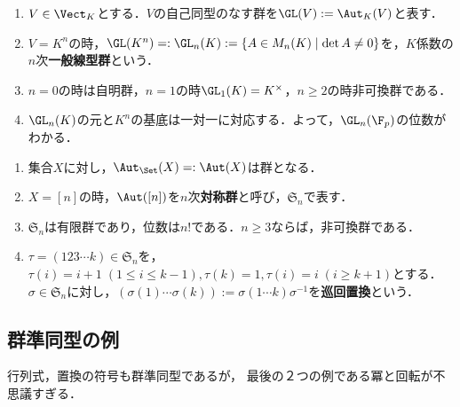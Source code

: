 \documentclass[uplatex, dvipdfmx]{jsreport}
\begin{document}
\begin{example}\mbox{}
    \begin{enumerate}
        \item $V\in\Vect_K$とする．$V$の自己同型のなす群を$\GL(V):=\Aut_K(V)$と表す．
        \item $V=K^n$の時，$\GL(K^n)=:\GL_n(K):=\{A\in M_n(K)\mid \det A\ne 0\}$を，$K$係数の$n$次\textbf{一般線型群}という．
        \item $n=0$の時は自明群，$n=1$の時$\GL_1(K)=K^\times$，$n\ge 2$の時非可換群である．
        \item $\GL_n(K)$の元と$K^n$の基底は一対一に対応する．よって，$\GL_n(\F_p)$の位数がわかる．
    \end{enumerate}
\end{example}

\begin{example}\mbox{}
    \begin{enumerate}
        \item 集合$X$に対し，$\Aut_\Set(X)=:\Aut(X)$は群となる．
        \item $X=[n]$の時，$\Aut([n])$を$n$次\textbf{対称群}と呼び，$\mathfrak{S}_n$で表す．
        \item $\mathfrak{S}_n$は有限群であり，位数は$n!$である．$n\ge 3$ならば，非可換群である．
        \item $\tau=(123\cdots k)\in\mathfrak{S}_n$を，$\tau(i)=i+1\;(1\le i\le k-1),\tau(k)=1,\tau(i)=i\;(i\ge k+1)$とする．$\sigma\in\mathfrak{S}_n$に対し，$(\sigma(1)\cdots\sigma(k)):=\sigma(1\cdots k)\sigma^{-1}$を\textbf{巡回置換}という．
    \end{enumerate}
\end{example}

\subsection{群準同型の例}

\begin{tcolorbox}[colframe=ForestGreen, colback=ForestGreen!10!white, breakable]
    行列式，置換の符号も群準同型であるが，
    最後の２つの例である冪と回転が不思議すぎる．
\end{tcolorbox}
\end{document}
